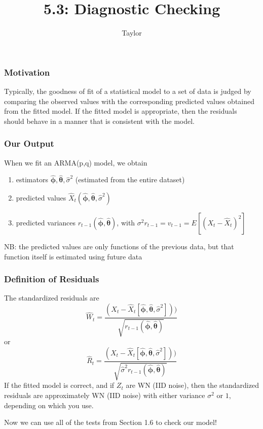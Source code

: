 \documentclass{beamer}
\title["5.3"]{5.3: Diagnostic Checking}
\author{Taylor}
\institute[UVA] 
{
University of Virginia \\
\medskip
\textit{} 
}
\date{}
\begin{document}

\begin{frame}
\titlepage 
\end{frame}

\begin{frame}
\frametitle{Motivation}

Typically, the goodness of fit of a statistical model to a set of data is judged by comparing the observed values with the corresponding predicted values obtained from the fitted model. If the fitted model is appropriate, then the residuals should behave in a manner that is consistent with the model.

\end{frame}


\begin{frame}
\frametitle{Our Output}

When we fit an ARMA(p,q) model, we obtain
\begin{enumerate}
\item estimators $\hat{\bm{\phi}}, \hat{\bm{\theta}}, \hat{\sigma}^2$ (estimated from the entire dataset)
\item predicted values $\hat{X}_t(\hat{\bm{\phi}}, \hat{\bm{\theta}}, \hat{\sigma}^2)$ 
\item predicted variances $r_{t-1}( \hat{\bm{\phi}}, \hat{\bm{\theta}})$, with $\sigma^2 r_{t-1} = v_{t-1} = E[(X_t - \hat{X}_t)^2]$
\end{enumerate}
NB: the predicted values are only functions of the previous data, but that function itself is estimated using future data

\end{frame}


\begin{frame}
\frametitle{Definition of Residuals}

The standardized residuals are
\[
\hat{W}_t = \frac{(X_t - \hat{X}_t[\hat{\bm{\phi}}, \hat{\bm{\theta}}, \hat{\sigma}^2] ) )}{ \sqrt{r_{t-1}( \hat{\bm{\phi}}, \hat{\bm{\theta}}) } }
\]
or 
\[
\hat{R}_t = \frac{(X_t - \hat{X}_t[\hat{\bm{\phi}}, \hat{\bm{\theta}}, \hat{\sigma}^2] ) )}{ \sqrt{\hat{\sigma}^2 r_{t-1}( \hat{\bm{\phi}}, \hat{\bm{\theta}}) } }
\]
If the fitted model is correct, and if $Z_t$ are WN (IID noise), then the standardized residuals are approximately WN (IID noise) with either variance $\sigma^2$ or $1$, depending on which you use.
\newline

Now we can use all of the tests from Section 1.6 to check our model!


\end{frame}
\end{document}
